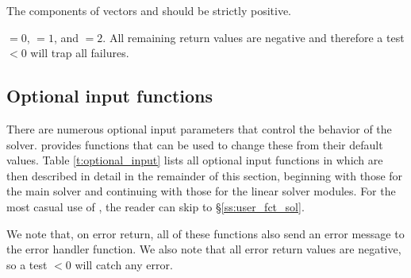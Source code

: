 {
  The components of vectors  and  should be strictly positive.
  
   $=0$,  $=1$, and 
   $=2$.
  All remaining return values are negative and therefore a test  $< 0$
  will trap all  failures.
}


\subsection{Optional input functions}\label{ss:optional_input}

There are numerous optional input parameters that control the behavior
of the {\kinsol} solver.  {\kinsol} provides functions that can be used
to change these from their default values.  Table \ref{t:optional_input}
lists all optional input functions in {\kinsol} which are then
described in detail in the remainder of this section, beginning with
those for the main {\kinsol} solver and continuing with those for the
linear solver modules. For the most casual use of {\kinsol}, the
reader can skip to \S\ref{ss:user_fct_sol}.

We note that, on error return, all of these functions also send an error message
to the error handler function.
We also note that all error return values are negative, so a test  $<0$
will catch any error.

